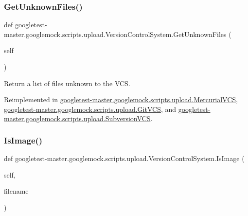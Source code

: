 \subsubsection{\texorpdfstring{GetUnknownFiles()}{GetUnknownFiles()}}
{\footnotesize\ttfamily def googletest-\/master.\+googlemock.\+scripts.\+upload.\+Version\+Control\+System.\+Get\+Unknown\+Files (\begin{DoxyParamCaption}\item[{}]{self }\end{DoxyParamCaption})}

\begin{DoxyVerb}Return a list of files unknown to the VCS.\end{DoxyVerb}
 

Reimplemented in \mbox{\hyperlink{classgoogletest-master_1_1googlemock_1_1scripts_1_1upload_1_1_mercurial_v_c_s_af98b91231f0042acd7ede5107c455339}{googletest-\/master.\+googlemock.\+scripts.\+upload.\+Mercurial\+V\+CS}}, \mbox{\hyperlink{classgoogletest-master_1_1googlemock_1_1scripts_1_1upload_1_1_git_v_c_s_affcaf406301de58b3b1ff4d91b2b6fae}{googletest-\/master.\+googlemock.\+scripts.\+upload.\+Git\+V\+CS}}, and \mbox{\hyperlink{classgoogletest-master_1_1googlemock_1_1scripts_1_1upload_1_1_subversion_v_c_s_aeab242f9211ebbb726d3b3a6631a0090}{googletest-\/master.\+googlemock.\+scripts.\+upload.\+Subversion\+V\+CS}}.

\mbox{\label{classgoogletest-master_1_1googlemock_1_1scripts_1_1upload_1_1_version_control_system_afc6e877e99a3611e353797b9e9091301}} 
\subsubsection{\texorpdfstring{IsImage()}{IsImage()}}
{\footnotesize\ttfamily def googletest-\/master.\+googlemock.\+scripts.\+upload.\+Version\+Control\+System.\+Is\+Image (\begin{DoxyParamCaption}\item[{}]{self,  }\item[{}]{filename }\end{DoxyParamCaption})}

